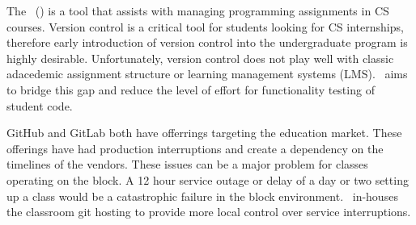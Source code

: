 %
%

The \longname~(\acronym) is a tool that assists with managing programming assignments in CS courses. 
Version control is a critical tool for students looking for CS internships, therefore early introduction of version control into the undergraduate program is highly desirable. 
Unfortunately, version control does not play well with classic adacedemic assignment structure or learning management systems (LMS). 
\acronym~aims to bridge this gap and reduce the level of effort for functionality testing of student code.

GitHub and GitLab both have offerrings targeting the education market. 
These offerings have had production interruptions and create a dependency on the timelines of the vendors. These issues can be a major problem for classes operating on the block. 
A 12 hour service outage or delay of a day or two setting up a class would be a catastrophic failure in the block environment. 
\acronym~in-houses the classroom git hosting to provide more local control over service interruptions.